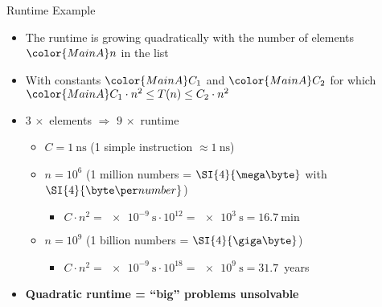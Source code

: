 \begin{frame}{Runtime Example}
  \begin{itemize}
    \item<1- |handout:1>
      The runtime is growing quadratically with the number of elements
      ${\color{MainA}n}$ in the list
    \item<2- |handout:1>
      With constants $\color{MainA}C_1$ and $\color{MainA}C_2$
      for which $\color{MainA}C_1 \cdot n^2 \leq T(n) \leq C_2 \cdot n^2$
    \item<3- |handout:1>
      $3\, \times$ elements $\Rightarrow$ $9\, \times$ runtime
      \begin{itemize}
        \item<4- |handout:1>
          $C = \SI{1}{\nano\second}$
          (1 simple instruction $\approx \SI{1}{\nano\second}$)
        \item<5- |handout:1>
          $n = 10^6$ (1 million numbers = $\SI{4}{\mega\byte}$
          with $\SI{4}{\byte\per number}$)
          \begin{itemize}
            \item
              $C \cdot n^2 = \SI{e-9}{\second} \cdot 10^{12}
              = \SI{e3}{\second} = \SI{16.7}{\minute}$
          \end{itemize}
        \item<6- |handout:1>
          $n = 10^9$ (1 billion numbers = $\SI{4}{\giga\byte}$)
          \begin{itemize}
            \item
              $C \cdot n^2 = \SI{e-9}{\second} \cdot 10^{18}
              = \SI{e9}{\second} = 31.7$~years
          \end{itemize}
      \end{itemize}
    \item<7- |handout:1>
      \textbf{Quadratic runtime = \enquote{big} problems unsolvable}
  \end{itemize}
\end{frame}
